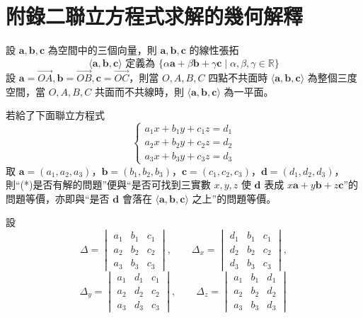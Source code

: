 \section*{附錄二\quad 聯立方程式求解的幾何解釋}
\label{sec:b3s_a2}

\renewcommand{\thefigure}{附2-\arabic{figure}}
\setcounter{figure}{0}

設 $\mathbf{a}, \mathbf{b}, \mathbf{c}$ 為空間中的三個向量，則 $\mathbf{a}, \mathbf{b}, \mathbf{c}$ 的線性張拓
\[ \langle \mathbf{a}, \mathbf{b}, \mathbf{c} \rangle \text{ 定義為 } \{\alpha\mathbf{a} + \beta\mathbf{b} + \gamma\mathbf{c} \mid \alpha, \beta, \gamma \in \mathbb{R}\} \]
設 $\mathbf{a} = \vec{OA}, \mathbf{b} = \vec{OB}, \mathbf{c} = \vec{OC}$，則當 $O, A, B, C$ 四點不共面時 $\langle \mathbf{a}, \mathbf{b}, \mathbf{c} \rangle$ 為整個三度空間，當 $O, A, B, C$ 共面而不共線時，則 $\langle \mathbf{a}, \mathbf{b}, \mathbf{c} \rangle$ 為一平面。

若給了下面聯立方程式
\[
\begin{cases}
a_1 x + b_1 y + c_1 z = d_1 \\
a_2 x + b_2 y + c_2 z = d_2 \\
a_3 x + b_3 y + c_3 z = d_3
\end{cases}
\tag{$*$}
\]
取 $\mathbf{a} = (a_1, a_2, a_3)$，$\mathbf{b} = (b_1, b_2, b_3)$，$\mathbf{c} = (c_1, c_2, c_3)$，$\mathbf{d} = (d_1, d_2, d_3)$，則“(*)是否有解的問題”便與“是否可找到三實數 $x, y, z$ 使 $\mathbf{d}$ 表成 $x\mathbf{a} + y\mathbf{b} + z\mathbf{c}$”的問題等價，亦即與“是否 $\mathbf{d}$ 會落在 $\langle \mathbf{a}, \mathbf{b}, \mathbf{c} \rangle$ 之上”的問題等價。

設
\[
\Delta = \begin{vmatrix} a_1 & b_1 & c_1 \\ a_2 & b_2 & c_2 \\ a_3 & b_3 & c_3 \end{vmatrix}, \qquad
\Delta_x = \begin{vmatrix} d_1 & b_1 & c_1 \\ d_2 & b_2 & c_2 \\ d_3 & b_3 & c_3 \end{vmatrix},
\]
\[
\Delta_y = \begin{vmatrix} a_1 & d_1 & c_1 \\ a_2 & d_2 & c_2 \\ a_3 & d_3 & c_3 \end{vmatrix}, \qquad
\Delta_z = \begin{vmatrix} a_1 & b_1 & d_1 \\ a_2 & b_2 & d_2 \\ a_3 & b_3 & d_3 \end{vmatrix}
\]

